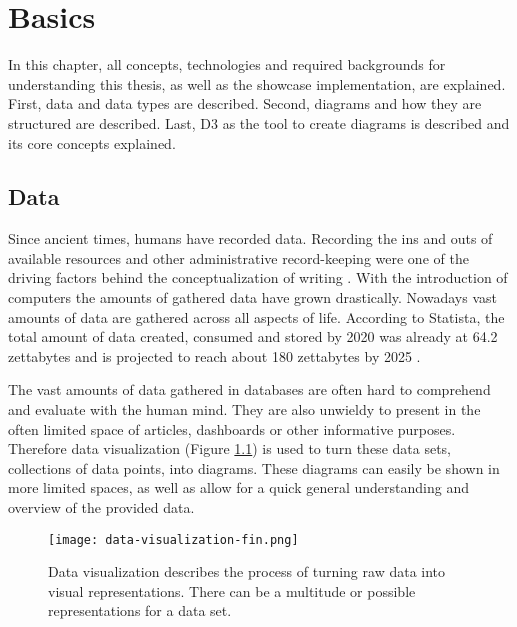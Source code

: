 \chapter{Basics}\label{sec:basics}

In this chapter, all concepts, technologies and required backgrounds for understanding this thesis, as well as the showcase implementation, are explained. First, data and data types are described. Second, diagrams and how they are structured are described. Last, D3 as the tool to create diagrams is described and its core concepts explained.


\section{Data}

Since ancient times, humans have recorded data. Recording the ins and outs of available resources and other administrative record-keeping were one of the driving factors behind the conceptualization of writing \cite{senner1991origins}.
With the introduction of computers the amounts of gathered data have grown drastically. Nowadays vast amounts of data are gathered across all aspects of life. According to Statista, the total amount of data created, consumed and stored by 2020 was already at 64.2 zettabytes and is projected to reach about 180 zettabytes by 2025 \cite{statista_2022}.

The vast amounts of data gathered in databases are often hard to comprehend and evaluate with the human mind. They are also unwieldy to present in the often limited space of articles, dashboards or other informative purposes. Therefore data visualization (Figure \ref{fig:data-visualization}) is used to turn these data sets, collections of data points, into diagrams. These diagrams can easily be shown in more limited spaces, as well as allow for a quick general understanding and overview of the provided data.

\begin{figure}
    \texttt{[image: data-visualization-fin.png]}
    \captionsetup{width=0.9\textwidth}
    \caption[data-visualization]{Data visualization describes the process of turning raw data into visual representations. There can be a multitude or possible representations for a data set.}
    \label{fig:data-visualization}
\end{figure}

